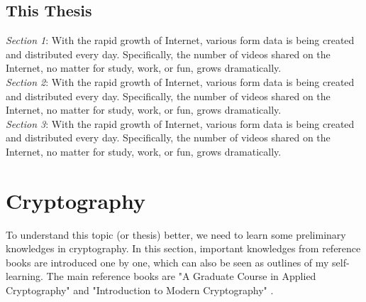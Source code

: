 \documentclass[a4paper,12pt,UTF8]{ctexart}
\begin{document}
\begin{spacing}{1.1}
\subsection{This Thesis}
\emph{Section 1}: With the rapid growth of Internet, various form data is being created and distributed every day. Specifically, the number of videos shared on the Internet, no matter for study, work, or fun, grows dramatically.  \vspace{2mm}
\\\indent\emph{Section 2}: With the rapid growth of Internet, various form data is being created and distributed every day. Specifically, the number of videos shared on the Internet, no matter for study, work, or fun, grows dramatically. \vspace{2mm}
\\\indent\emph{Section 3}: With the rapid growth of Internet, various form data is being created and distributed every day. Specifically, the number of videos shared on the Internet, no matter for study, work, or fun, grows dramatically. \vspace{2mm}
\indent
\clearpage %
\indent
\clearpage

\section{Cryptography}
\setcounter{table}{0}
\setcounter{figure}{0}
To understand this topic (or thesis) better, we need to learn some preliminary knowledges in cryptography. In this section,  important knowledges from reference books are introduced one by one, which can also be seen as outlines of my self-learning. The main reference books are "A Graduate Course in Applied Cryptography" \cite{boneh2008graduate} and "Introduction to Modern Cryptography" \cite{katz2014introduction}. %

\end{spacing}
\end{document}
